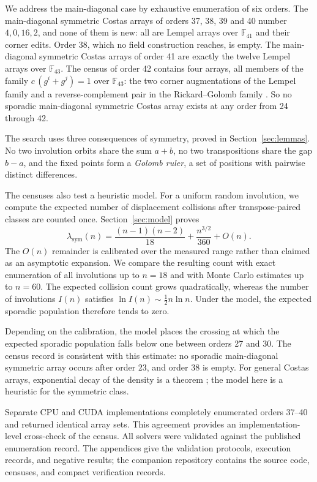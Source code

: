 \documentclass[11pt]{article}
\begin{document}
We address the main-diagonal case by exhaustive enumeration of six orders.
The main-diagonal symmetric Costas arrays of orders 37, 38, 39 and 40 number
$4, 0, 16, 2$, and none of them is new: all are Lempel arrays over
$\mathbb{F}_{41}$ and their corner edits.  Order 38, which no field
construction reaches, is empty.  The main-diagonal symmetric Costas
arrays of order 41 are exactly the twelve Lempel arrays over
$\mathbb{F}_{43}$.  The census of order 42 contains four arrays, all
members of the family $c\,(g^{i}+g^{j})=1$ over $\mathbb{F}_{43}$: the
two corner augmentations of the Lempel family and a reverse-complement
pair in the Rickard--Golomb family
\cite{Rickard2004Periodicity,Drakakis2011OpenProblems}.  So no sporadic
main-diagonal symmetric Costas array exists at any order from 24 through 42.

The search uses three consequences of symmetry, proved in
Section~\ref{sec:lemmas}.  No two involution orbits share the sum $a+b$,
no two transpositions share the gap $b-a$, and the fixed points form a
\emph{Golomb ruler}, a set of positions with pairwise distinct
differences.

The censuses also test a heuristic model.  For a uniform random
involution, we compute the expected number of displacement collisions
after transpose-paired classes are counted once.  Section~\ref{sec:model}
proves
\[
\lambda_{\mathrm{sym}}(n)
= \frac{(n-1)(n-2)}{18}+\frac{n^{3/2}}{360}+O(n).
\]
The $O(n)$ remainder is calibrated over the measured range rather than
claimed as an asymptotic expansion.  We compare the resulting count
with exact enumeration of all involutions up to $n=18$ and with Monte
Carlo estimates up to $n=60$.  The expected collision count grows quadratically,
whereas the number of involutions $I(n)$ satisfies
$\ln I(n)\sim\tfrac12 n\ln n$.  Under the model, the expected sporadic
population therefore tends to zero.

Depending on the calibration, the model places the crossing at which the
expected sporadic population falls below one between orders 27 and 30.
The census record is consistent with this estimate: no sporadic main-diagonal
symmetric array occurs after order 23, and order 38 is empty.  For general Costas
arrays, exponential decay of the density is a theorem
\cite{WarnkeCorrellSwanson2023}; the model here is a heuristic for the
symmetric class.

Separate CPU and CUDA implementations completely enumerated orders
37--40 and returned identical array sets.  This agreement provides an
implementation-level cross-check of the census.  All solvers were
validated against the published enumeration record.
The appendices give the validation protocols, execution records, and
negative results; the companion repository contains the source code,
censuses, and compact verification records.
\end{document}

